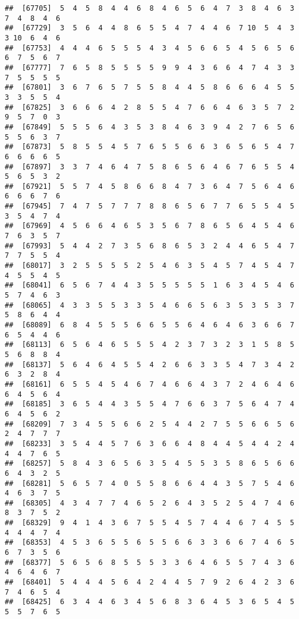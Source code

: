 \documentclass[
]{book}
\begin{document}
\begin{verbatim}
##  [67705]  5  4  5  8  4  4  6  8  4  6  5  6  4  7  3  8  4  6  3  7  4  8  4  6
##  [67729]  3  5  6  4  4  8  6  5  5  4  7  4  4  6  7 10  5  4  3  3 10  6  4  6
##  [67753]  4  4  4  6  5  5  5  4  3  4  5  6  6  5  4  5  6  5  6  6  7  5  6  7
##  [67777]  7  6  5  8  5  5  5  5  9  9  4  3  6  6  4  7  4  3  3  7  5  5  5  5
##  [67801]  3  6  7  6  5  7  5  5  8  4  4  5  8  6  6  6  4  5  5  3  3  5  5  4
##  [67825]  3  6  6  6  4  2  8  5  5  4  7  6  6  4  6  3  5  7  2  9  5  7  0  3
##  [67849]  5  5  5  6  4  3  5  3  8  4  6  3  9  4  2  7  6  5  6  5  5  6  3  7
##  [67873]  5  8  5  5  4  5  7  6  5  5  6  6  3  6  5  6  5  4  7  6  6  6  6  5
##  [67897]  3  3  7  4  6  4  7  5  8  6  5  6  4  6  7  6  5  5  4  5  6  5  3  2
##  [67921]  5  5  7  4  5  8  6  6  8  4  7  3  6  4  7  5  6  4  6  6  6  6  7  6
##  [67945]  7  4  7  5  7  7  7  8  8  6  5  6  7  7  6  5  5  4  5  3  5  4  7  4
##  [67969]  4  5  6  6  4  6  5  3  5  6  7  8  6  5  6  4  5  4  6  7  6  3  5  7
##  [67993]  5  4  4  2  7  3  5  6  8  6  5  3  2  4  4  6  5  4  7  7  7  5  5  4
##  [68017]  3  2  5  5  5  5  2  5  4  6  3  5  4  5  7  4  5  4  7  4  5  5  4  5
##  [68041]  6  5  6  7  4  4  3  5  5  5  5  5  1  6  3  4  5  4  6  5  7  4  6  3
##  [68065]  4  3  3  5  5  3  3  5  4  6  6  5  6  3  5  3  5  3  7  5  8  6  4  4
##  [68089]  6  8  4  5  5  5  6  6  5  5  6  4  6  4  6  3  6  6  7  6  5  4  4  6
##  [68113]  6  5  6  4  6  5  5  5  4  2  3  7  3  2  3  1  5  8  5  5  6  8  8  4
##  [68137]  5  6  4  6  4  5  5  4  2  6  6  3  3  5  4  7  3  4  2  6  3  2  8  4
##  [68161]  6  5  5  4  5  4  6  7  4  6  6  4  3  7  2  4  6  4  6  6  4  5  6  4
##  [68185]  3  6  5  4  4  3  5  5  4  7  6  6  3  7  5  6  4  7  4  6  4  5  6  2
##  [68209]  7  3  4  5  5  6  6  2  5  4  4  2  7  5  5  6  6  5  6  2  4  7  7  7
##  [68233]  3  5  4  4  5  7  6  3  6  6  4  8  4  4  5  4  4  2  4  4  4  7  6  5
##  [68257]  5  8  4  3  6  5  6  3  5  4  5  5  3  5  8  6  5  6  6  6  4  3  2  5
##  [68281]  5  6  5  7  4  0  5  5  8  6  6  4  4  3  5  7  5  4  6  4  6  3  7  5
##  [68305]  4  3  4  7  7  4  6  5  2  6  4  3  5  2  5  4  7  4  6  8  3  7  5  2
##  [68329]  9  4  1  4  3  6  7  5  5  4  5  7  4  4  6  7  4  5  5  4  4  4  7  4
##  [68353]  4  5  3  6  5  5  6  5  5  6  6  3  3  6  6  7  4  6  5  6  7  3  5  6
##  [68377]  5  6  5  6  8  5  5  5  3  3  6  4  6  5  5  7  4  3  6  4  6  4  6  7
##  [68401]  5  4  4  4  5  6  4  2  4  4  5  7  9  2  6  4  2  3  6  7  4  6  5  4
##  [68425]  6  3  4  4  6  3  4  5  6  8  3  6  4  5  3  6  5  4  5  5  5  7  6  5

\end{verbatim}
\end{document}
